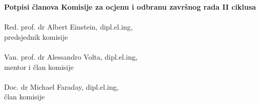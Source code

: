 \pagebreak
\thispagestyle{plain}
\vspace{2cm}
\begin{center}
\textbf{\Large Potpisi članova Komisije za ocjenu i odbranu završnog rada II ciklusa}\\


\vspace{4cm}
\makebox[10cm]{\hrulefill} \\
Red. prof. dr Albert Einstein, dipl.el.ing, \\
predsjednik komisije\\

\vspace{3cm}
\makebox[10cm]{\hrulefill} \\
Van. prof. dr Alessandro Volta, dipl.el.ing, \\
mentor i član komisije\\

\vspace{3cm}
\makebox[10cm]{\hrulefill} \\
Doc. dr Michael Faraday, dipl.el.ing, \\
član komisije

\end{center}
